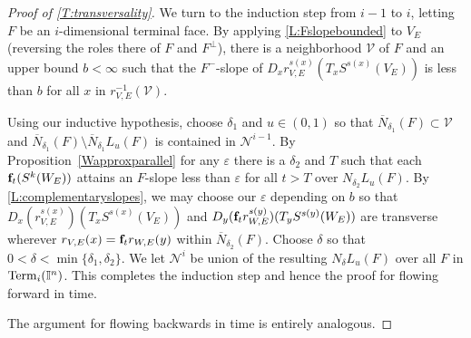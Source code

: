 \begin{proof}[Proof of \cref{T:transversality}]
	We turn to the induction step from $i-1$ to $i$, letting $F$ be an $i$-dimensional terminal face.
	By applying \cref{L:Fslopebounded} to $V_E$ (reversing the roles there of $F$ and $F^\perp$),
	there is a neighborhood $\mathcal{V}$ of $F$ and an upper bound $b < \infty$ such that
	the $F^-$-slope of $D_xr^{s(x)}_{V,E}(T_xS^{s(x)}(V_E))$ is less than $b$ for all $x$ in $r_{V,E}^{-1}(\mathcal{V})$.


	Using our inductive hypothesis, choose $\delta_1$ and $u \in (0, 1)$ so that $\overline N_{\delta_1}(F) \subset \mathcal{V}$ and $\overline N_{\delta_1}(F) \setminus \overline N_{\delta_1} L_u(F)$ is contained in $\mathcal N^{i-1}$.
	By Proposition~\ref{Wapproxparallel} for any $\varepsilon$ there is a $\delta_2$ and $T$
	such that each $\mathbf{f}_t(S^k(W_E))$ attains an $F$-slope less than $\varepsilon$ for all $t>T$ over $N_{\delta_2} L_u(F)$.
	By \cref{L:complementaryslopes}, we may choose our $\varepsilon$ depending on $b$ so that $D_x(r^{s(x)}_{V,E})(T_xS^{s(x)}(V_E))$ and $D_y(\mathbf{f}_tr^{s(y)}_{W,E})(T_yS^{s(y)}(W_E))$ are transverse wherever $r_{V,E}(x) = \mathbf{f}_tr_{W,E}(y)$ within $\overline N_{\delta_2}(F)$.
	Choose $\delta$ so that $0 < \delta < \min\{\delta_1,\delta_2\}$.
	We let $\mathcal N^i$ be union of the resulting $N_{\delta} L_u(F)$ over all $F$ in ${\rm Term}_i(\mathbb{I}^n)$.
	This completes the induction step and hence the proof for flowing forward in time.

	The argument for flowing backwards in time is entirely analogous.
\end{proof}



